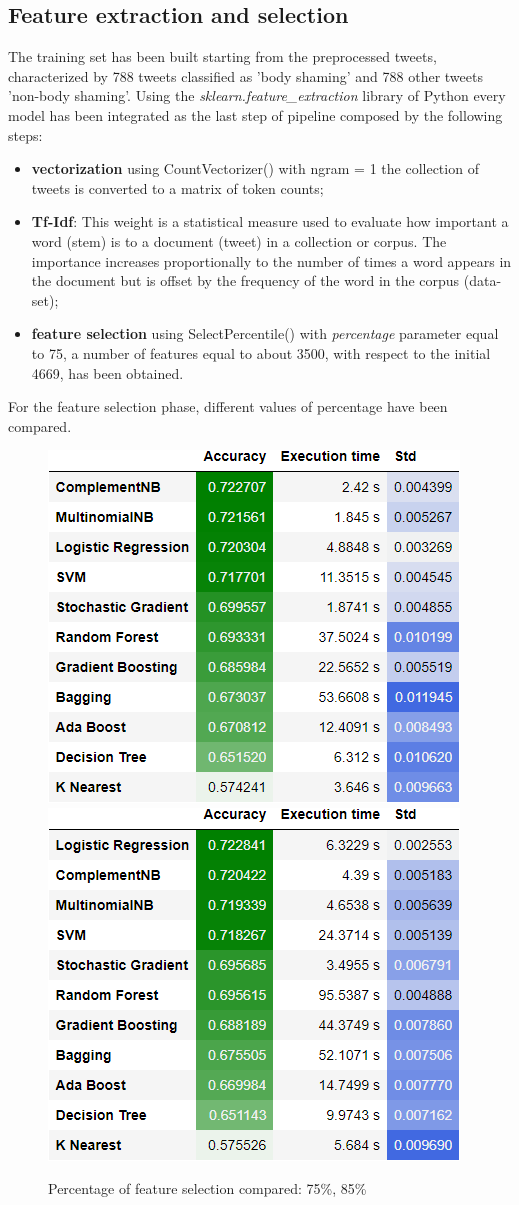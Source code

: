 \subsection{Feature extraction and selection}
The training set has been built starting from the preprocessed tweets, characterized by 788 tweets classified as 'body shaming' and 788 other tweets 'non-body shaming'.
Using the \emph{sklearn.feature\_extraction} library of Python every model has been integrated as the last step of pipeline composed by the following steps:

\begin{itemize}
\item \textbf{vectorization} using CountVectorizer() with ngram = 1 the collection of tweets is converted to a matrix of token counts;
\item  \textbf{Tf-Idf}: This weight is a statistical measure used to evaluate how important a word (stem) is to a document (tweet) in a collection or corpus. The importance increases proportionally to the number of times a word appears in the document but is offset by the frequency of the word in the corpus (data-set);
\item \textbf{feature selection} using SelectPercentile() with \emph{percentage} parameter equal to 75, a number of features equal to about 3500, with respect to the initial 4669, has been obtained. \end{itemize}

\noindent
For the feature selection phase, different values of percentage have been compared.


\begin{figure}[H]
\centering
\includegraphics[width=.47\textwidth]{images/features/cross_val_result_75.png}\hfil
\includegraphics[width=.47\textwidth]{images/features/cross_val_result_85.png}

\caption{Percentage of feature selection compared: 75\%, 85\%}\label{fig:75-85}
\end{figure}

